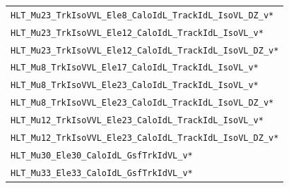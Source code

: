 \begin{table}[htb]
\begin{tabular}[width=\textwidth]{l}
  \verb|HLT_Mu23_TrkIsoVVL_Ele8_CaloIdL_TrackIdL_IsoVL_DZ_v*|                     \\
  \verb|HLT_Mu23_TrkIsoVVL_Ele12_CaloIdL_TrackIdL_IsoVL_v*|                     \\
  \verb|HLT_Mu23_TrkIsoVVL_Ele12_CaloIdL_TrackIdL_IsoVL_DZ_v*|                     \\
  \verb|HLT_Mu8_TrkIsoVVL_Ele17_CaloIdL_TrackIdL_IsoVL_v*|                     \\
  \verb|HLT_Mu8_TrkIsoVVL_Ele23_CaloIdL_TrackIdL_IsoVL_v*|                     \\
  \verb|HLT_Mu8_TrkIsoVVL_Ele23_CaloIdL_TrackIdL_IsoVL_DZ_v*|                     \\
  \verb|HLT_Mu12_TrkIsoVVL_Ele23_CaloIdL_TrackIdL_IsoVL_v*|                     \\
  \verb|HLT_Mu12_TrkIsoVVL_Ele23_CaloIdL_TrackIdL_IsoVL_DZ_v*|                     \\
  \verb|HLT_Mu30_Ele30_CaloIdL_GsfTrkIdVL_v*|                     \\
  \verb|HLT_Mu33_Ele33_CaloIdL_GsfTrkIdVL_v*|                     \\
  \hline
 \end{tabular}
 \vspace{\baselineskip}
\end{table}




